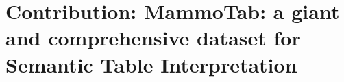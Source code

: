\section{Contribution: MammoTab: a giant and comprehensive dataset for
Semantic Table Interpretation}

